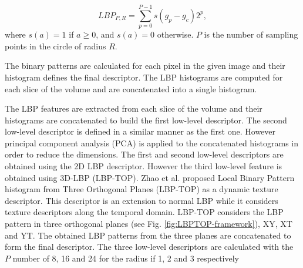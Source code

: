\begin{equation} \label{Eq:LBP}
LBP_{P,R} = \sum_{p=0}^{P-1}s(g_{p} - g_{c})2^{p},
\end{equation}
where $s(a) = 1$ if $a \geq 0$, and $s(a)=0$ otherwise. $P$ is the number of sampling points in the circle of radius $R$.

The binary patterns are calculated for each pixel in the given image and their histogram defines the final descriptor.
The LBP histograms are computed for each slice of the volume and are concatenated into a single histogram.




The LBP features are extracted from each slice of the volume and their histograms are concatenated to build the first low-level descriptor. The second low-level descriptor is defined in a similar manner as the first one. However principal component analysis (PCA) is applied to the concatenated histograms in order to reduce the dimensions. The first and second low-level descriptors are obtained using the 2D LBP descriptor. However the third low-level feature is obtained using 3D-LBP (LBP-TOP). Zhao et al. \cite{zhao2007dynamic} proposed Local Binary Pattern histogram from Three Orthogonal Planes (LBP-TOP) as a dynamic texture descriptor. This descriptor is an extension to normal LBP while it considers texture descriptors along the temporal domain. LBP-TOP considers the LBP pattern in three orthogonal planes (see Fig. \ref{fig:LBPTOP-framework}), XY, XT and YT. The obtained LBP patterns from the three planes are concatenated to form the final descriptor. The three low-level descriptors are calculated with the $P$ number of 8, 16 and 24 for the radius if 1, 2 and 3 respectively

